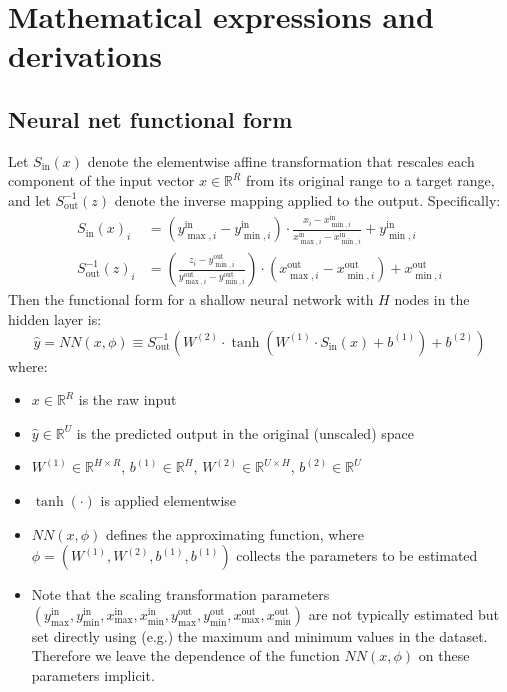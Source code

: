 \documentclass[a4paper,12pt]{article}
\begin{document}
\clearpage
\appendix

{\centering {} \par}

\setcounter{page}{1}
\setcounter{equation}{0} 

\section{Mathematical expressions and derivations}
\label{app:maths}

\subsection{Neural net functional form}

Let \( S_{\text{in}}(x) \) denote the elementwise affine transformation that rescales each component of the input vector \( x \in \mathbb{R}^R \) from its original range to a target range, and let \( S_{\text{out}}^{-1}(z) \) denote the inverse mapping applied to the output. Specifically:
\begin{align*}
S_{\text{in}}(x)_i &= (y_{\max,i}^{\text{in}} - y_{\min,i}^{\text{in}}) \cdot \frac{x_i - x_{\min,i}^{\text{in}}}{x_{\max,i}^{\text{in}} - x_{\min,i}^{\text{in}}} + y_{\min,i}^{\text{in}} \\
S_{\text{out}}^{-1}(z)_i &= \left( \frac{z_i - y_{\min,i}^{\text{out}}}{y_{\max,i}^{\text{out}} - y_{\min,i}^{\text{out}}} \right) \cdot (x_{\max,i}^{\text{out}} - x_{\min,i}^{\text{out}}) + x_{\min,i}^{\text{out}}
\end{align*}
Then the functional form for a shallow neural network with $H$ nodes in the hidden layer is:
\[
\hat{y} = NN(x,\phi) \equiv S_{\text{out}}^{-1} \left( W^{(2)} \cdot \tanh\left( W^{(1)} \cdot S_{\text{in}}(x) + b^{(1)} \right) + b^{(2)} \right)
\]
where:
\begin{itemize}
  \item \( x \in \mathbb{R}^R \) is the raw input
  \item \( \hat{y} \in \mathbb{R}^U \) is the predicted output in the original (unscaled) space
  \item \( W^{(1)} \in \mathbb{R}^{H \times R} \), \( b^{(1)} \in \mathbb{R}^H \), \( W^{(2)} \in \mathbb{R}^{U \times H} \), \( b^{(2)} \in \mathbb{R}^U \)
  \item \( \tanh(\cdot) \) is applied elementwise
  \item $NN(x,\phi)$ defines the approximating function, where $\phi = (W^{(1)},W^{(2)},b^{(1)},b^{(1)})$ collects the parameters to be estimated
  \item Note that the scaling transformation parameters $(y_{\max}^{\text{in}},y_{\min}^{\text{in}},x_{\max}^{\text{in}},x_{\min}^{\text{in}},y_{\max}^{\text{out}},y_{\min}^{\text{out}},x_{\max}^{\text{out}},x_{\min}^{\text{out}})$ are not typically estimated but set directly using (e.g.) the maximum and minimum values in the dataset. Therefore we leave the dependence of the function $NN(x,\phi)$ on these parameters implicit. 
\end{itemize}
\end{document}
